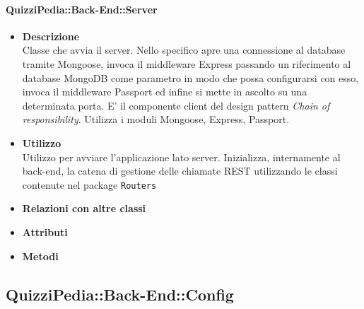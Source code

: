 	\paragraph{QuizziPedia::Back-End::Server}
	\begin{itemize}
		\item \textbf{Descrizione} \\
		Classe che avvia il server. Nello specifico apre una connessione al database tramite Mongoose, invoca il middleware Express passando un riferimento al database MongoDB come parametro in modo  che possa configurarsi con esso, invoca il middleware Passport ed infine si mette in ascolto su una determinata porta. E' il componente client del design pattern \textit{Chain of responsibility}. Utilizza i moduli Mongoose, Express, Passport.
		\item \textbf{Utilizzo} \\
		Utilizzo per avviare l'applicazione lato server. Inizializza, internamente al back-end, la catena di gestione delle chiamate REST utilizzando le classi contenute nel package \texttt{Routers}
		\item \textbf{Relazioni con altre classi}
		\item \textbf{Attributi}
		\item \textbf{Metodi}
	\end{itemize}
	
\subsection{QuizziPedia::Back-End::Config}
